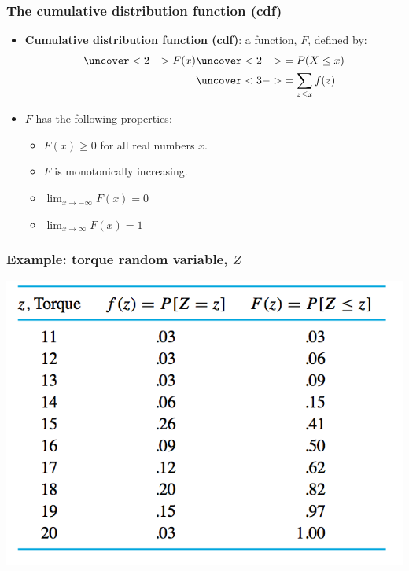 \documentclass[handout]{beamer}\usepackage[]{graphicx}\usepackage[]{color}
\providecommand{\rt}{\rightarrow}
\numberwithin{equation}{section}
\begin{document}
\begin{frame}
\frametitle{The cumulative distribution function (cdf)}

\begin{itemize}
\item {\bf Cumulative distribution function (cdf)}: a function, $F$, defined by:
\begin{align*}
\uncover<2->{F(x)} &\uncover<2->{= P(X \le x)}\\
& \uncover<3->{= \sum_{z \le x} f(z)}
\end{align*}
\pause \pause  \pause \item $F$ has the following properties:
\begin{itemize}
\pause \item $F(x) \ge 0$ for all real numbers $x$.
\pause \item $F$ is monotonically increasing.
\pause \item $\lim_{x \rt -\infty} F(x) = 0$
\pause \item $\lim_{x \rt \infty} F(x) = 1$
\end{itemize}

\end{itemize}
\end{frame}

\begin{frame}
\frametitle{Example: torque random variable, $Z$}
 \includegraphics{../../fig/torquep.png}
\end{frame}
\end{document}

